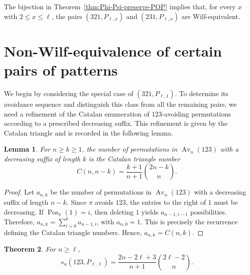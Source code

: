 \documentclass[11pt]{article}
\newtheorem{thm}{Theorem}[section]
\newtheorem{lem}[thm]{Lemma}
\begin{document}
The bijection in Theorem~\ref{thm:Phi-Psi-preserve-POP} implies that, for every $x$ with $2\leq x\leq\ell$, the pairs $(321,P_{\ell,x})$ and $(231,P_{\ell,x})$ are Wilf-equivalent.

\section{Non-Wilf-equivalence of certain pairs of patterns}\label{S3}

We begin by considering the special case of $(321,P_{\ell,1})$. To determine
its avoidance sequence and distinguish this class from all the remaining
pairs, we need a refinement of the Catalan enumeration of $123$-avoiding
permutations according to a prescribed decreasing suffix. This refinement is
given by the Catalan triangle and is recorded in the following lemma.

\begin{lem}\label{321_de}
For $n\geq k\geq1$, the number of permutations in $\operatorname{Av}_n(123)$ with a decreasing
suffix of length $k$ is the Catalan triangle number
\begin{equation*}
C(n,n-k)=\frac{k+1}{n+1}\binom{2n-k}{n}.    
\end{equation*}
\end{lem}

\begin{proof}
Let $a_{n,k}$ be the number of permutations in $\operatorname{Av}_n(123)$
with a decreasing suffix of length $n-k$. Since $\pi$ avoids $123$, the
entries to the right of $1$ must be decreasing. If
$\operatorname{Pos}_\pi(1)=i$, then deleting $1$ yields
$a_{n-1,i-1}$ possibilities. Therefore,
$a_{n,k}=\sum_{i=0}^k a_{n-1,i}$, with $a_{n,0}=1$.
This is precisely the recurrence defining the Catalan triangle numbers.
Hence, $a_{n,k}=C(n,k)$.
\end{proof}

\begin{thm}\label{thm-123-Pll}
For $n\ge\ell$,
\begin{equation*}
    s_n(123,P_{\ell,\ell})=\frac{2n-2\ell+3}{n+1}\binom{2\ell-2}n.
\end{equation*}
\end{thm}
\end{document}
